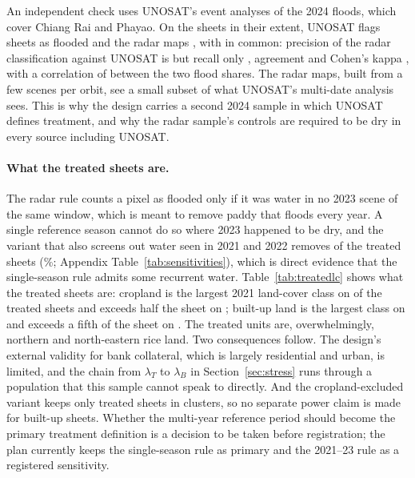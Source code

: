 An independent check uses UNOSAT's event analyses of the 2024 floods, which cover Chiang Rai and Phayao. On the \unoSheets{} sheets in their extent, UNOSAT flags \unoTreated{} sheets as flooded and the radar maps \unoRadarTreated, with \unoBoth{} in common: precision of the radar classification against UNOSAT is \unoPrecision{} but recall only \unoRecall, agreement \unoAgreement{} and Cohen's kappa \unoKappa, with a correlation of \unoCorr{} between the two flood shares. The radar maps, built from a few scenes per orbit, see a small subset of what UNOSAT's multi-date analysis sees. This is why the design carries a second 2024 sample in which UNOSAT defines treatment, and why the radar sample's controls are required to be dry in every source including UNOSAT.

\paragraph{What the treated sheets are.} The radar rule counts a pixel as flooded only if it was water in no 2023 scene of the same window, which is meant to remove paddy that floods every year. A single reference season cannot do so where 2023 happened to be dry, and the variant that also screens out water seen in 2021 and 2022 removes \sensRefDropped{} of the \radarTreated{} treated sheets (\sensRefDroppedPct\%; Appendix Table~\ref{tab:sensitivities}), which is direct evidence that the single-season rule admits some recurrent water. Table~\ref{tab:treatedlc} shows what the treated sheets are: cropland is the largest 2021 land-cover class on \tlcCropDominant{} of the \tlcTreated{} treated sheets and exceeds half the sheet on \tlcCropOverHalf; built-up land is the largest class on \tlcBuiltDominant{} and exceeds a fifth of the sheet on \tlcBuiltOverTwenty. The treated units are, overwhelmingly, northern and north-eastern rice land. Two consequences follow. The design's external validity for bank collateral, which is largely residential and urban, is limited, and the chain from $\lambda_T$ to $\lambda_B$ in Section~\ref{sec:stress} runs through a population that this sample cannot speak to directly. And the cropland-excluded variant keeps only \sensNocropTreated{} treated sheets in \sensNocropClusters{} clusters, so no separate power claim is made for built-up sheets. Whether the multi-year reference period should become the primary treatment definition is a decision to be taken before registration; the plan currently keeps the single-season rule as primary and the 2021--23 rule as a registered sensitivity.

